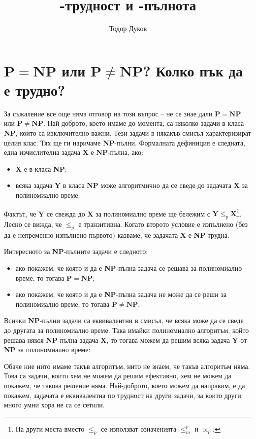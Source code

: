 \documentclass{article}
\title{\NP-трудност и \NP-пълнота}
\author{Тодор Дуков}
\date{}
\newcommand{\NP}{\textbf{NP}}
\theoremstyle{definition}
\theoremstyle{plain}
\theoremstyle{remark}
\theoremstyle{definition}
\begin{document}
\maketitle

\section*{$\mathbf{P = NP}$ или $\mathbf{P \neq NP}$? Колко пък да е трудно?}

За съжаление все още няма отговор на този въпрос -- не се знае дали $\mathbf{P = NP}$  или $\mathbf{P \neq NP}$.
Най-доброто, което имаме до момента, са няколко задачи в класа \NP, които са изключително важни.
Тези задачи в някакъв смисъл характеризират целия клас.
Тях ще ги наричаме \NP-пълни.
Формалната дефиниция е следната, една изчислителна задача \textbf{X} е \NP-пълна, ако:
\begin{itemize}
    \item \textbf{X} е в класа \NP;
    \item всяка задача \textbf{Y} в класа \NP{ }може алгоритмично да се сведе до задачата \textbf{X} за полиномиално време.
\end{itemize}
Фактът, че \textbf{Y} се свежда до \textbf{X} за полиномиално време ще бележим с $\mathbf{Y} \leq_p \mathbf{X}$\footnote{На други места вместо $\leq_p$ се използват означенията $\leq^p_m$ и $\propto_p$.}.
Лесно се вижда, че $\leq_p$ е транзитивна.
Когато второто условие е изпълнено (без да е непременно изпълнено първото) казваме, че задачата \textbf{X} е \NP-трудна.

Интересното за \NP-пълните задачи е следното:
\begin{itemize}
    \item ако покажем, че която и да е \NP-пълна задача се решава за полиномиално време, то тогава $\mathbf{P = NP}$;
    \item ако покажем, че която и да е \NP-пълна задача не може да се реши за полиномиално време, то тогава $\mathbf{P \neq NP}$.
\end{itemize}
Всички \NP-пълни задачи са еквивалентни в смисъл, че всяка може да се сведе до другата за полиномиално време.
Така имайки полиномиално алгоритъм, който решава някоя \NP-пълна задача \textbf{X}, то тогава можем да решим всяка задача \textbf{Y} от \NP{} за полиномиално време:

Обаче ние нито имаме такъв алгоритъм, нито не знаем, че такъв алгоритъм няма.
Това са задачи, които хем не можем да решим ефективно, хем не можем да покажем, че такова решение няма.
Най-доброто, което можем да направим, е да покажем, задачата е еквивалентна по трудност на други задачи, за които други много умни хора не са се сетили.
\end{document}
